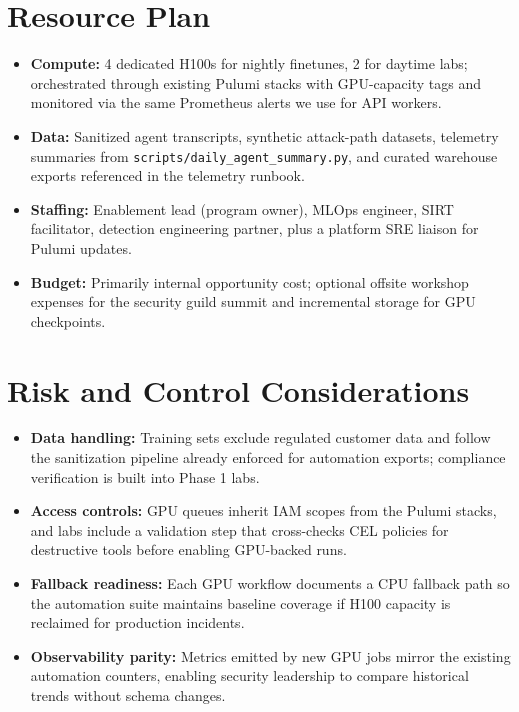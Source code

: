 \documentclass[11pt]{scrartcl}
\begin{document}
\section{Resource Plan}
\begin{itemize}
  \item \textbf{Compute:} 4 dedicated H100s for nightly finetunes, 2 for daytime labs; orchestrated through existing Pulumi stacks with GPU-capacity tags and monitored via the same Prometheus alerts we use for API workers.
  \item \textbf{Data:} Sanitized agent transcripts, synthetic attack-path datasets, telemetry summaries from \texttt{scripts/daily\_agent\_summary.py}, and curated warehouse exports referenced in the telemetry runbook.
  \item \textbf{Staffing:} Enablement lead (program owner), MLOps engineer, SIRT facilitator, detection engineering partner, plus a platform SRE liaison for Pulumi updates.
  \item \textbf{Budget:} Primarily internal opportunity cost; optional offsite workshop expenses for the security guild summit and incremental storage for GPU checkpoints.
\end{itemize}

\section{Risk and Control Considerations}
\begin{itemize}
  \item \textbf{Data handling:} Training sets exclude regulated customer data and follow the sanitization pipeline already enforced for automation exports; compliance verification is built into Phase 1 labs.
  \item \textbf{Access controls:} GPU queues inherit IAM scopes from the Pulumi stacks, and labs include a validation step that cross-checks CEL policies for destructive tools before enabling GPU-backed runs.
  \item \textbf{Fallback readiness:} Each GPU workflow documents a CPU fallback path so the automation suite maintains baseline coverage if H100 capacity is reclaimed for production incidents.
  \item \textbf{Observability parity:} Metrics emitted by new GPU jobs mirror the existing automation counters, enabling security leadership to compare historical trends without schema changes.
\end{itemize}
\end{document}

